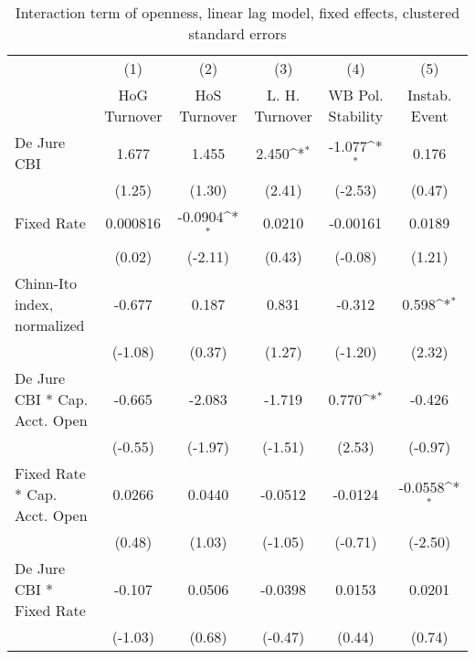 {
\def\sym#1{\ifmmode^{#1}\else\(^{#1}\)\fi}
\begin{longtable}{l*{5}{c}}
\caption{Interaction term of openness, linear lag model, fixed effects, clustered standard errors \label{kapintlagsDJ}}\\
\hline\hline\endfirsthead\hline\endhead\hline\endfoot\endlastfoot
                &\multicolumn{1}{c}{(1)}&\multicolumn{1}{c}{(2)}&\multicolumn{1}{c}{(3)}&\multicolumn{1}{c}{(4)}&\multicolumn{1}{c}{(5)}\\
                &\multicolumn{1}{c}{HoG Turnover}&\multicolumn{1}{c}{HoS Turnover}&\multicolumn{1}{c}{L. H. Turnover}&\multicolumn{1}{c}{WB Pol. Stability}&\multicolumn{1}{c}{Instab. Event}\\
\hline
De Jure CBI     &    1.677         &    1.455         &    2.450\sym{*}  &   -1.077\sym{*}  &    0.176         \\
                &   (1.25)         &   (1.30)         &   (2.41)         &  (-2.53)         &   (0.47)         \\
[1em]
Fixed Rate      & 0.000816         &  -0.0904\sym{*}  &   0.0210         & -0.00161         &   0.0189         \\
                &   (0.02)         &  (-2.11)         &   (0.43)         &  (-0.08)         &   (1.21)         \\
[1em]
Chinn-Ito index, normalized&   -0.677         &    0.187         &    0.831         &   -0.312         &    0.598\sym{*}  \\
                &  (-1.08)         &   (0.37)         &   (1.27)         &  (-1.20)         &   (2.32)         \\
[1em]
De Jure CBI * Cap. Acct. Open&   -0.665         &   -2.083         &   -1.719         &    0.770\sym{*}  &   -0.426         \\
                &  (-0.55)         &  (-1.97)         &  (-1.51)         &   (2.53)         &  (-0.97)         \\
[1em]
Fixed Rate * Cap. Acct. Open&   0.0266         &   0.0440         &  -0.0512         &  -0.0124         &  -0.0558\sym{*}  \\
                &   (0.48)         &   (1.03)         &  (-1.05)         &  (-0.71)         &  (-2.50)         \\
[1em]
De Jure CBI * Fixed Rate&   -0.107         &   0.0506         &  -0.0398         &   0.0153         &   0.0201         \\
                &  (-1.03)         &   (0.68)         &  (-0.47)         &   (0.44)         &   (0.74)         \\

\end{longtable}}
